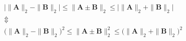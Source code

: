 \begin{gather}\label{eq:v2ungleichung}
\big| \|\mathbf{A}\|_2 - \|\mathbf{B}\|_2 \big| \le
	\|\mathbf{A} \pm \mathbf{B}\|_2 \le \big| \|\mathbf{A}\|_2 + \|\mathbf{B}\|_2 \big| \nonumber \\
\Updownarrow \\
\big(\|\mathbf{A}\|_2 - \|\mathbf{B}\|_2\big)^2 \le \|\mathbf{A} \pm \mathbf{B}\|_2^2 \le
	\big(\|\mathbf{A}\|_2 + \|\mathbf{B}\|_2\big)^2 \nonumber
\end{gather}

